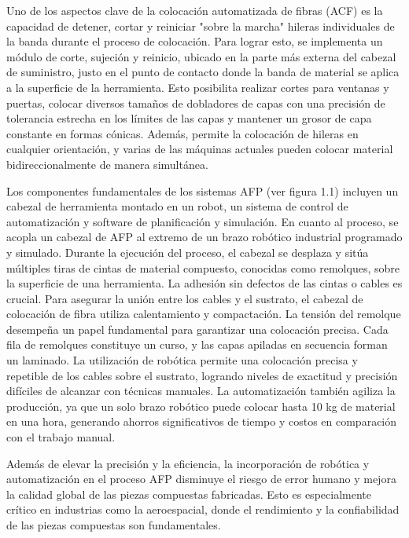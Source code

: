 Uno de los aspectos clave de la colocación automatizada de fibras (ACF) es la capacidad de detener, cortar y reiniciar "sobre la marcha" hileras individuales de la banda durante el proceso de colocación. Para lograr esto, se implementa un módulo de corte, sujeción y reinicio, ubicado en la parte más externa del cabezal de suministro, justo en el punto de contacto donde la banda de material se aplica a la superficie de la herramienta. Esto posibilita realizar cortes para ventanas y puertas, colocar diversos tamaños de dobladores de capas con una precisión de tolerancia estrecha en los límites de las capas y mantener un grosor de capa constante en formas cónicas. Además, permite la colocación de hileras en cualquier orientación, y varias de las máquinas actuales pueden colocar material bidireccionalmente de manera simultánea.

Los componentes fundamentales de los sistemas AFP (ver figura 1.1) incluyen un cabezal de herramienta montado en un robot, un sistema de control de automatización y software de planificación y simulación.
En cuanto al proceso, se acopla un cabezal de AFP al extremo de un brazo robótico industrial programado y simulado. Durante la ejecución del proceso, el cabezal se desplaza y sitúa múltiples tiras de cintas de material compuesto, conocidas como remolques, sobre la superficie de una herramienta. La adhesión sin defectos de las cintas o cables es crucial. Para asegurar la unión entre los cables y el sustrato, el cabezal de colocación de fibra utiliza calentamiento y compactación. La tensión del remolque desempeña un papel fundamental para garantizar una colocación precisa. Cada fila de remolques constituye un curso, y las capas apiladas en secuencia forman un laminado. La utilización de robótica permite una colocación precisa y repetible de los cables sobre el sustrato, logrando niveles de exactitud y precisión difíciles de alcanzar con técnicas manuales. La automatización también agiliza la producción, ya que un solo brazo robótico puede colocar hasta 10 kg de material en una hora, generando ahorros significativos de tiempo y costos en comparación con el trabajo manual.

Además de elevar la precisión y la eficiencia, la incorporación de robótica y automatización en el proceso AFP disminuye el riesgo de error humano y mejora la calidad global de las piezas compuestas fabricadas. Esto es especialmente crítico en industrias como la aeroespacial, donde el rendimiento y la confiabilidad de las piezas compuestas son fundamentales.

